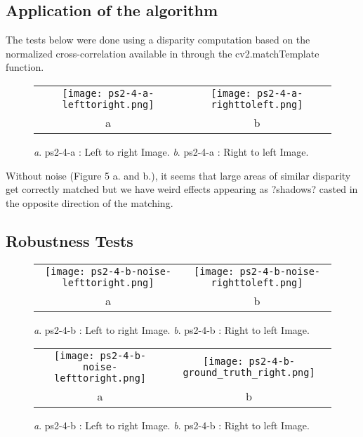 \documentclass[a4paper,11pt]{article}
\begin{document}
\subsection{Application of the algorithm}

The tests below were done using a disparity computation based on the normalized cross-correlation available in through the cv2.matchTemplate function.

 \begin{figure}[H]
\begin{center}
\begin{tabular}{cc}
	\texttt{[image: ps2-4-a-lefttoright.png]}&
	\texttt{[image: ps2-4-a-righttoleft.png]}\\
	a&b
\end{tabular}
\end{center}
\caption{ 
\textit{a}. ps2-4-a : Left to right Image.  \textit{b}. ps2-4-a : Right to left Image. }
\label{ps2-1}
\end{figure}


Without noise (Figure 5 a. and b.), it seems that large areas of similar disparity get correctly matched but we have weird effects appearing as ?shadows? casted in the opposite direction of the matching.

\subsection{Robustness Tests}

 \begin{figure}[H]
\begin{center}
\begin{tabular}{cc}
	\texttt{[image: ps2-4-b-noise-lefttoright.png]}&
	\texttt{[image: ps2-4-b-noise-righttoleft.png]}\\
	a&b
\end{tabular}
\end{center}
\caption{ 
\textit{a}. ps2-4-b : Left to right Image.  \textit{b}. ps2-4-b : Right to left Image. }
\label{ps2-1}
\end{figure}



 \begin{figure}[H]
\begin{center}
\begin{tabular}{cc}
	\texttt{[image: ps2-4-b-noise-lefttoright.png]}&
	\texttt{[image: ps2-4-b-ground\_truth\_right.png]}\\
	a&b
\end{tabular}
\end{center}
\caption{ 
\textit{a}. ps2-4-b : Left to right Image.  \textit{b}. ps2-4-b : Right to left Image. }
\label{ps2-1}
\end{figure}
\end{document}
